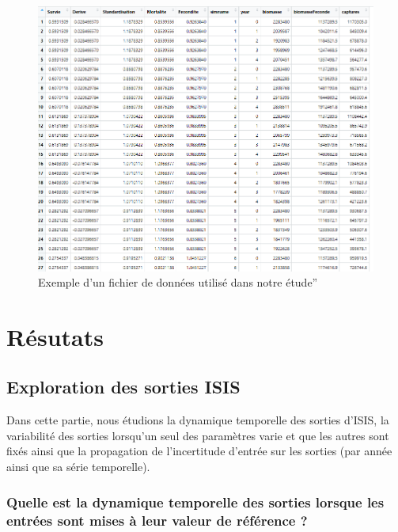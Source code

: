 \documentclass[
]{article}
\begin{document}
\begin{figure}
\centering
\includegraphics{exDonnees.png}
\caption{Exemple d'un fichier de données utilisé dans notre étude''}
\end{figure}

\newpage

\hypertarget{ruxe9sutats}{%
\section{Résutats}\label{ruxe9sutats}}

\hypertarget{exploration-des-sorties-isis}{%
\subsection{Exploration des sorties
ISIS}\label{exploration-des-sorties-isis}}

Dans cette partie, nous étudions la dynamique temporelle des sorties
d'ISIS, la variabilité des sorties lorsqu'un seul des paramètres varie
et que les autres sont fixés ainsi que la propagation de l'incertitude
d'entrée sur les sorties (par année ainsi que sa série temporelle).

\hypertarget{quelle-est-la-dynamique-temporelle-des-sorties-lorsque-les-entruxe9es-sont-mises-uxe0-leur-valeur-de-ruxe9fuxe9rence}{%
\subsubsection{Quelle est la dynamique temporelle des sorties lorsque
les entrées sont mises à leur valeur de référence
?}\label{quelle-est-la-dynamique-temporelle-des-sorties-lorsque-les-entruxe9es-sont-mises-uxe0-leur-valeur-de-ruxe9fuxe9rence}}
\end{document}
